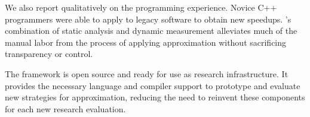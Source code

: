 We also report qualitatively on the programming experience.
Novice C++ programmers were able to apply \sysname to
legacy software to obtain new speedups.
\sysname's combination of static analysis and dynamic measurement alleviates
much of the manual labor from the process of applying
approximation without sacrificing transparency or control.

The \sysname framework is open source and ready for use as research
infrastructure.
It provides the necessary language and compiler support to prototype and
evaluate new strategies for approximation,
reducing the need to reinvent these components for each new research
evaluation.
